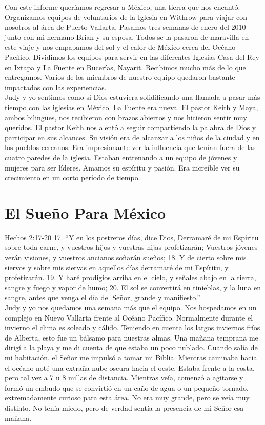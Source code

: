 \documentclass[twoside, 12pt]{book}
\begin{document}
Con este informe queríamos regresar a México, una tierra que nos encantó. Organizamos equipos de voluntarios de la Iglesia en Withrow para viajar con nosotros al área de Puerto Vallarta. Pasamos tres semanas de enero del 2010 junto con mi hermano Brian y su esposa. Todos se la pasaron de maravilla en este viaje y nos empapamos del sol y el calor de México cerca del Océano Pacífico. Dividimos los equipos para servir en las diferentes Iglesias Casa del Rey en Ixtapa y La Fuente en Bucerías, Nayarit. Recibimos mucho más de lo que entregamos.  Varios de los miembros de nuestro equipo quedaron bastante impactados con las experiencias.\\

Judy y yo sentimos como si Dios estuviera solidificando una llamada a pasar más tiempo con las iglesias en México. La Fuente era nueva. El pastor Keith y Maya, ambos bilingües, nos recibieron con brazos abiertos y nos hicieron sentir muy queridos. El pastor Keith nos alentó a seguir compartiendo la palabra de Dios y participar en sus alcances. Su visión era de alcanzar a los niños de la ciudad y en los pueblos cercanos. Era impresionante ver la influencia que tenían fuera de las cuatro paredes de la iglesia. Estaban entrenando a un equipo de jóvenes y mujeres para ser líderes. Amamos su espíritu y pasión. Era increíble ver su crecimiento en un corto período de tiempo.\\

\section{El Sueño Para México}

Hechos 2:17-20
17. “Y en los postreros días, dice Dios, Derramaré de mi Espíritu sobre toda carne, y vuestros hijos y vuestras hijas profetizarán; Vuestros jóvenes verán visiones, y vuestros ancianos soñarán sueños; 18. Y de cierto sobre mis siervos y sobre mis siervas en aquellos días derramaré de mi Espíritu, y profetizarán. 19. Y haré prodigios arriba en el cielo, y señales abajo en la tierra, sangre y fuego y vapor de humo; 20. El sol se convertirá en tinieblas, y la luna en sangre, antes que venga el día del Señor, grande y manifiesto.''\\

Judy y yo nos quedamos una semana más que el equipo. Nos hospedamos en un complejo en Nuevo Vallarta frente al Océano Pacífico. Normalmente durante el invierno el clima es soleado y cálido. Teniendo en cuenta los largos inviernos fríos de Alberta, esto fue un bálsamo para nuestras almas. Una mañana temprana me dirigí a la playa y me di cuenta de que estaba un poco nublado. Cuando salía de mi habitación, el Señor me impulsó a tomar mi Biblia. Mientras caminaba hacia el océano noté una extraña nube oscura hacia el oeste. Estaba frente a la costa, pero tal vez a 7 u 8 millas de distancia. Mientras veía, comenzó a agitarse y formó un embudo que se convirtió en un caño de agua o un pequeño tornado, extremadamente curioso para esta área. No era muy grande, pero se veía muy distinto. No tenía miedo, pero de verdad sentía la presencia de mi Señor esa mañana.\\
\end{document}
